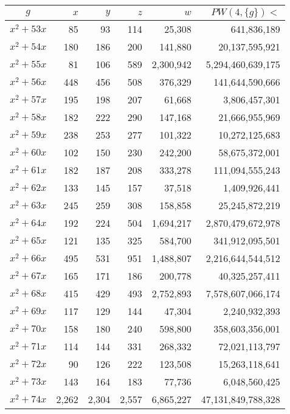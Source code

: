 \documentclass{article}
\begin{document}
\begin{center}
\begin{tabular}{ | c | r | r | r | r | r | }
$g$ & $x$ & $y$ & $z$ & $w$ & $PW(4, \{g\}) <$ \\ \hline
$x^2 + 53x$ & 85 & 93 & 114 & 25{,}308 & 641{,}836{,}189 \\ \hline
$x^2 + 54x$ & 180 & 186 & 200 & 141{,}880 & 20{,}137{,}595{,}921 \\ \hline
$x^2 + 55x$ & 81 & 106 & 589 & 2{,}300{,}942 & 5{,}294{,}460{,}639{,}175 \\ \hline
$x^2 + 56x$ & 448 & 456 & 508 & 376{,}329 & 141{,}644{,}590{,}666 \\ \hline
$x^2 + 57x$ & 195 & 198 & 207 & 61{,}668 & 3{,}806{,}457{,}301 \\ \hline
$x^2 + 58x$ & 182 & 222 & 290 & 147{,}168 & 21{,}666{,}955{,}969 \\ \hline
$x^2 + 59x$ & 238 & 253 & 277 & 101{,}322 & 10{,}272{,}125{,}683 \\ \hline
$x^2 + 60x$ & 102 & 150 & 230 & 242{,}200 & 58{,}675{,}372{,}001 \\ \hline
$x^2 + 61x$ & 182 & 187 & 208 & 333{,}278 & 111{,}094{,}555{,}243 \\ \hline
$x^2 + 62x$ & 133 & 145 & 157 & 37{,}518 & 1{,}409{,}926{,}441 \\ \hline
$x^2 + 63x$ & 245 & 259 & 308 & 158{,}858 & 25{,}245{,}872{,}219 \\ \hline
$x^2 + 64x$ & 192 & 224 & 504 & 1{,}694{,}217 & 2{,}870{,}479{,}672{,}978 \\ \hline
$x^2 + 65x$ & 121 & 135 & 325 & 584{,}700 & 341{,}912{,}095{,}501 \\ \hline
$x^2 + 66x$ & 495 & 531 & 951 & 1{,}488{,}807 & 2{,}216{,}644{,}544{,}512 \\ \hline
$x^2 + 67x$ & 165 & 171 & 186 & 200{,}778 & 40{,}325{,}257{,}411 \\ \hline
$x^2 + 68x$ & 415 & 429 & 493 & 2{,}752{,}893 & 7{,}578{,}607{,}066{,}174 \\ \hline
$x^2 + 69x$ & 117 & 129 & 144 & 47{,}304 & 2{,}240{,}932{,}393 \\ \hline
$x^2 + 70x$ & 158 & 180 & 240 & 598{,}800 & 358{,}603{,}356{,}001 \\ \hline
$x^2 + 71x$ & 114 & 144 & 331 & 268{,}332 & 72{,}021{,}113{,}797 \\ \hline
$x^2 + 72x$ & 90 & 126 & 222 & 123{,}508 & 15{,}263{,}118{,}641 \\ \hline
$x^2 + 73x$ & 143 & 164 & 183 & 77{,}736 & 6{,}048{,}560{,}425 \\ \hline
$x^2 + 74x$ & 2{,}262 & 2{,}304 & 2{,}557 & 6{,}865{,}227 & 47{,}131{,}849{,}788{,}328 \\ \hline

\end{tabular}
\end{center}
\end{document}
